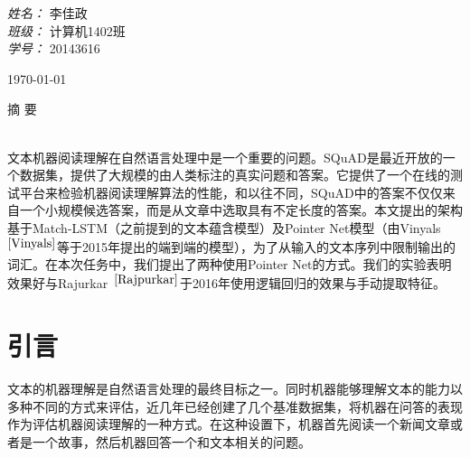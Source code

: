 \documentclass{article}
\begin{document}
\begin{CJK*}{UTF8}{gbsn}
\begin{titlepage}
\begin{center}
            \vspace{5cm}
            \begin{minipage}{0.4\textwidth}
            \begin{flushleft} 
                \LARGE \emph{姓名：} 李佳政  \\
                \LARGE \emph{班级：} 计算机1402班 \\
                \LARGE \emph{学号：} 20143616 \\
            \end{flushleft}
            \end{minipage}          

            \vfill
            
            {\large \today}
            
            \end{center}
            
        \end{titlepage}

    \maketitle

    \pagestyle{fancy}
    \cfoot{\thepage}
    \renewcommand{\headrulewidth}{0.4pt}
    \renewcommand{\headwidth}{\textwidth}
    \renewcommand{\footrulewidth}{0pt}

    \begin{center}
        \LARGE{摘 要} \\
        ~\\
        \begin{minipage}{12cm}
            \normalsize{ 文本机器阅读理解在自然语言处理中是一个重要的问题。SQuAD是最近开放的一个数据集，提供了大规模的由人类标注的真实问题和答案。它提供了一个在线的测试平台来检验机器阅读理解算法的性能，和以往不同，SQuAD中的答案不仅仅来自一个小规模候选答案，而是从文章中选取具有不定长度的答案。本文提出的架构基于Match-LSTM（之前提到的文本蕴含模型）及Pointer Net模型（由Vinyals~$^{\cite{Vinyals}}$等于2015年提出的端到端的模型），为了从输入的文本序列中限制输出的词汇。在本次任务中，我们提出了两种使用Pointer Net的方式。我们的实验表明效果好与Rajurkar~$^{\cite{Rajpurkar}}$于2016年使用逻辑回归的效果与手动提取特征。}
        \end{minipage}

    \end{center}
    \section{引言}
        文本的机器理解是自然语言处理的最终目标之一。同时机器能够理解文本的能力以多种不同的方式来评估，近几年已经创建了几个基准数据集，将机器在问答的表现作为评估机器阅读理解的一种方式。在这种设置下，机器首先阅读一个新闻文章或者是一个故事，然后机器回答一个和文本相关的问题。
        \vspace{1ex}


\end{CJK*}
\end{document}
